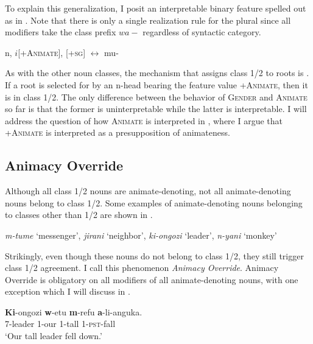 \documentclass[output=paper
,newtxmath
,modfonts
,nonflat]{langsci/langscibook}
\begin{document}
To explain this generalization, I posit an interpretable binary  feature spelled out as in . Note that there is only a single realization rule for the plural since all modifiers take the class prefix $wa-$ regardless of syntactic category.

\ea\label{ex:pesetsky:howtobeanimate} \ea\label{ex:pesetsky:howtobeanimatea}{ n, $i$[+\textsc{Animate}], [\textsc{+sg}] $\longleftrightarrow$ mu-}
 \label{ex:pesetsky:howtobeanimateb}
  \z \z

As with the other noun classes, the mechanism that assigns class 1/2 to roots is .  If a root is selected for by an n-head bearing the feature value +\textsc{Animate}, then it is in class 1/2.  The only difference between the behavior of \textsc{Gender} and \textsc{Animate} so far is that the former is uninterpretable while the latter is interpretable. I will address the question of how \textsc{Animate} is interpreted in , where I argue that +\textsc{Animate} is interpreted as a presupposition of animateness.


\subsection{Animacy Override} \label{sec:pesetsky:animateoverridesubsection}

Although all class 1/2 nouns are animate-denoting, not all animate-denoting nouns belong to class 1/2.  Some examples of animate-denoting nouns belonging to classes other than 1/2 are shown in .

\ea\label{ex:pesetsky:cryptoanimates}{\textit{m-tume} `messenger', \textit{jirani} `neighbor', \textit{ki-ongozi} `leader', \textit{n-yani} `monkey'} \z

Strikingly, even though these nouns do not belong to class 1/2, they still trigger class 1/2 agreement. I call this phenomenon \textit{Animacy Override}. Animacy Override is obligatory on all modifiers of all animate-denoting nouns, with one exception which I will discuss in .

 \ea\label{ex:pesetsky:kiongozeh} 
 \ea\label{ex:pesetsky:kiongozia}{
 \gll \textbf{Ki}-ongozi \textbf{w}-etu \textbf{m}-refu \textbf{a}-li-anguka. \\
     \textsc{7}-leader \textsc{1}-our \textsc{1}-tall \textsc{1}-\textsc{pst}-fall \\ 
     \glt `Our tall leader fell down.'
     } 
\z \z     
     
\end{document}
